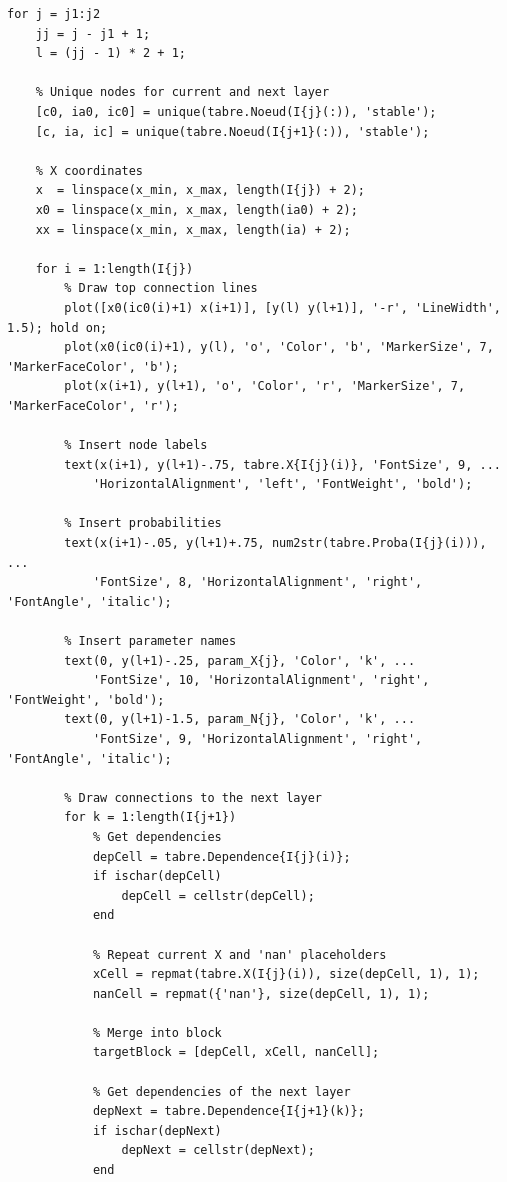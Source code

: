\begin{matlab}
\begin{lstlisting}[caption={Hàm vẽ sơ đồ mô hình Singletons}]
for j = j1:j2
    jj = j - j1 + 1;
    l = (jj - 1) * 2 + 1;
    
    % Unique nodes for current and next layer
    [c0, ia0, ic0] = unique(tabre.Noeud(I{j}(:)), 'stable');
    [c, ia, ic] = unique(tabre.Noeud(I{j+1}(:)), 'stable');
    
    % X coordinates
    x  = linspace(x_min, x_max, length(I{j}) + 2);
    x0 = linspace(x_min, x_max, length(ia0) + 2);
    xx = linspace(x_min, x_max, length(ia) + 2);
    
    for i = 1:length(I{j}) 
        % Draw top connection lines
        plot([x0(ic0(i)+1) x(i+1)], [y(l) y(l+1)], '-r', 'LineWidth', 1.5); hold on;
        plot(x0(ic0(i)+1), y(l), 'o', 'Color', 'b', 'MarkerSize', 7, 'MarkerFaceColor', 'b');
        plot(x(i+1), y(l+1), 'o', 'Color', 'r', 'MarkerSize', 7, 'MarkerFaceColor', 'r');
        
        % Insert node labels
        text(x(i+1), y(l+1)-.75, tabre.X{I{j}(i)}, 'FontSize', 9, ...
            'HorizontalAlignment', 'left', 'FontWeight', 'bold');
        
        % Insert probabilities
        text(x(i+1)-.05, y(l+1)+.75, num2str(tabre.Proba(I{j}(i))), ...
            'FontSize', 8, 'HorizontalAlignment', 'right', 'FontAngle', 'italic');
        
        % Insert parameter names
        text(0, y(l+1)-.25, param_X{j}, 'Color', 'k', ...
            'FontSize', 10, 'HorizontalAlignment', 'right', 'FontWeight', 'bold');
        text(0, y(l+1)-1.5, param_N{j}, 'Color', 'k', ...
            'FontSize', 9, 'HorizontalAlignment', 'right', 'FontAngle', 'italic');   
    
        % Draw connections to the next layer
        for k = 1:length(I{j+1})
            % Get dependencies
            depCell = tabre.Dependence{I{j}(i)};
            if ischar(depCell)
                depCell = cellstr(depCell);
            end
            
            % Repeat current X and 'nan' placeholders
            xCell = repmat(tabre.X(I{j}(i)), size(depCell, 1), 1);
            nanCell = repmat({'nan'}, size(depCell, 1), 1);
            
            % Merge into block
            targetBlock = [depCell, xCell, nanCell];
            
            % Get dependencies of the next layer
            depNext = tabre.Dependence{I{j+1}(k)};
            if ischar(depNext)
                depNext = cellstr(depNext);
            end
            

\end{lstlisting}
\end{matlab}
